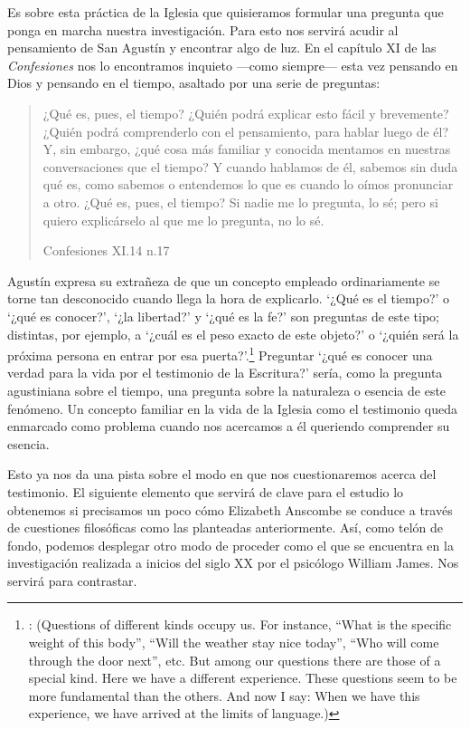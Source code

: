 Es sobre esta práctica de la Iglesia que quisieramos formular una pregunta que ponga en marcha nuestra investigación. Para esto nos servirá acudir al pensamiento de San Agustín y encontrar algo de luz. En el capítulo XI de las \emph{Confesiones} nos lo encontramos inquieto ---como siempre--- esta vez pensando en Dios y pensando en el tiempo, asaltado por una serie de preguntas:

\blockquote[Confesiones XI.14 n.17]{¿Qué es, pues, el tiempo? ¿Quién podrá explicar esto fácil y brevemente? ¿Quién podrá comprenderlo con el pensamiento, para hablar luego de él? Y, sin embargo, ¿qué cosa más familiar y conocida mentamos en nuestras conversaciones que el tiempo? Y cuando hablamos de él, sabemos sin duda qué es, como sabemos o entendemos lo que es cuando lo oímos pronunciar a otro. ¿Qué es, pues, el tiempo? Si nadie me lo pregunta, lo sé; pero si quiero explicárselo al que me lo pregunta, no lo sé.}

Agustín expresa su extrañeza de que un concepto empleado ordinariamente se torne tan desconocido cuando llega la hora de explicarlo. \enquote*{¿Qué es el tiempo?} o \enquote*{¿qué es conocer?}, \enquote*{¿la libertad?} y \enquote*{¿qué es la fe?} son preguntas de este tipo; distintas, por ejemplo, a \enquote*{¿cuál es el peso exacto de este objeto?} o \enquote*{¿quién será la próxima persona en entrar por esa puerta?}.\footnote{\cite[Cf.~][304]{wittgenstein2005bt}: (Questions of different kinds occupy us. For instance, ``What is the specific weight of this body'', ``Will the weather stay nice today'', ``Who will come through the door next'', etc. But among our questions there are those of a special kind. Here we have a different experience. These questions seem to be more fundamental than the others. And now I say: When we have this experience, we have arrived at the limits of language.)} Preguntar \enquote*{¿qué es conocer una verdad para la vida por el testimonio de la Escritura?} sería, como la pregunta agustiniana sobre el tiempo, una pregunta sobre la naturaleza o esencia de este fenómeno. Un concepto familiar en la vida de la Iglesia como el testimonio queda enmarcado como problema cuando nos acercamos a él queriendo comprender su esencia.

Esto ya nos da una pista sobre el modo en que nos cuestionaremos acerca del testimonio. El siguiente elemento que servirá de clave para el estudio lo obtenemos si precisamos un poco cómo Elizabeth Anscombe se conduce a través de cuestiones filosóficas como las planteadas anteriormente. Así, como telón de fondo, podemos desplegar otro modo de proceder como el que se encuentra en la investigación realizada a inicios del siglo XX por el psicólogo William James. Nos servirá para contrastar.

